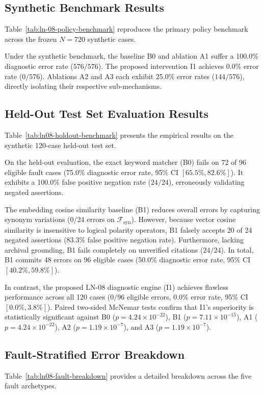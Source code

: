 \documentclass[11pt,a4paper]{article}
\begin{document}
\subsection{Synthetic Benchmark Results}
Table~\ref{tab:ln-08-policy-benchmark} reproduces the primary policy benchmark across the frozen $N=720$ synthetic cases.



Under the synthetic benchmark, the baseline B0 and ablation A1 suffer a 100.0\% diagnostic error rate ($576/576$). The proposed intervention I1 achieves 0.0\% error rate ($0/576$). Ablations A2 and A3 each exhibit 25.0\% error rates ($144/576$), directly isolating their respective sub-mechanisms.

\subsection{Held-Out Test Set Evaluation Results}
Table~\ref{tab:ln08-holdout-benchmark} presents the empirical results on the synthetic 120-case held-out test set.



On the held-out evaluation, the exact keyword matcher (B0) fails on 72 of 96 eligible fault cases (75.0\% diagnostic error rate, 95\% CI $[65.5\%, 82.6\%]$). It exhibits a 100.0\% false positive negation rate ($24/24$), erroneously validating negated assertions.

The embedding cosine similarity baseline (B1) reduces overall errors by capturing synonym variations (0/24 errors on $\mathcal{F}_{\text{syn}}$). However, because vector cosine similarity is insensitive to logical polarity operators, B1 falsely accepts 20 of 24 negated assertions (83.3\% false positive negation rate). Furthermore, lacking archival grounding, B1 fails completely on unverified citations ($24/24$). In total, B1 commits 48 errors on 96 eligible cases (50.0\% diagnostic error rate, 95\% CI $[40.2\%, 59.8\%]$).

In contrast, the proposed LN-08 diagnostic engine (I1) achieves flawless performance across all 120 cases ($0/96$ eligible errors, 0.0\% error rate, 95\% CI $[0.0\%, 3.8\%]$). Paired two-sided McNemar tests confirm that I1's superiority is statistically significant against B0 ($p = 4.24 \times 10^{-22}$), B1 ($p = 7.11 \times 10^{-15}$), A1 ($p = 4.24 \times 10^{-22}$), A2 ($p = 1.19 \times 10^{-7}$), and A3 ($p = 1.19 \times 10^{-7}$).

\subsection{Fault-Stratified Error Breakdown}
Table~\ref{tab:ln08-fault-breakdown} provides a detailed breakdown across the five fault archetypes.
\end{document}

